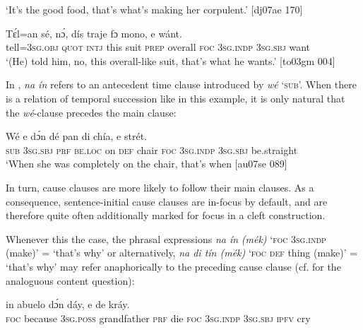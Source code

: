 \glt ‘It’s the good food, that’s what’s making her corpulent.’ [dj07ae 170]
\z


\ea%
    \label{ex:key:722}
    \gll Tɛ́l=an    sé,    nɔ́,  dís  traje  fɔ  mono,
      e    wánt.\\
tell=\textsc{3sg.obj}  \textsc{quot}    \textsc{intj}  this  suit    \textsc{prep}  overall
\textsc{foc}  \textsc{3sg.indp}  \textsc{3sg.sbj}  want\\

\glt ‘(He) told him, no, this overall-like suit, that’s what 
he wants.’ [to03gm 004]
\z

In , \textit{na ín} refers to an antecedent time clause introduced by \textit{wé} ‘\textsc{sub}’. When there is a relation of temporal succession like in this example, it is only natural that the \textit{wé}{}-clause precedes the main clause:


\ea%
    \label{ex:key:723}
    \gll Wé  e    dɔ́n  dé    pan  di  chía,        e    strét.\\
\textsc{sub}  \textsc{3sg.sbj}  \textsc{prf}  \textsc{be.loc}  on  \textsc{def}  chair  \textsc{foc}  \textsc{3sg.indp}  \textsc{3sg.sbj}  be.straight\\

\glt ‘When she was completely on the chair, that’s when 
[au07se 089]
\z

In turn, cause clauses are more likely to follow their main clauses. As a consequence, sentence-initial cause clauses are in-focus by default, and are therefore quite often additionally marked for focus in a cleft construction. 


Whenever this the case, the phrasal expressions \textit{na ín} \textit{(mék)} ‘\textsc{foc} \textsc{3sg.indp} (make)’ = ‘that’s why’  or alternatively, \textit{na di tín (mék)} ‘\textsc{foc} \textsc{def} thing (make)’ = ‘that’s why’  may refer anaphorically to the preceding cause clause (cf.  for the analoguous content question):



\ea%
    \label{ex:key:724}
    \gll {}    in    abuelo    dɔ́n  dáy,  
      e    de  kráy.\\
\textsc{foc}  because  \textsc{3sg.poss}  grandfather  \textsc{prf}  die 
\textsc{foc}  \textsc{3sg.indp}  \textsc{3sg.sbj}  \textsc{ipfv} cry\\

